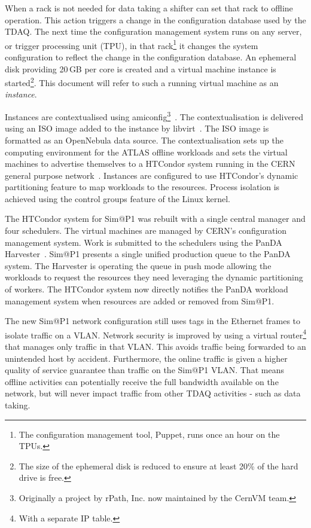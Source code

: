 \documentclass{webofc}
\begin{document}
When a rack is not needed for data taking a shifter can set that rack to
offline operation. This action triggers a change in the configuration database
used by the TDAQ. The next time the configuration management system runs on any
server, or trigger processing unit (TPU), in that rack\footnote{The
configuration management tool, Puppet, runs once an hour on the TPUs.} it
changes the system configuration to reflect the change in the configuration
database. An ephemeral disk providing 20\,\textrm{GB} per core is
created and a virtual machine instance is started\footnote{The size of the
ephemeral disk is reduced to ensure at least 20\% of the hard drive is free.}.
This document will refer to such a running virtual machine as an
\textit{instance}.

Instances are contextualised using amiconfig\footnote{Originally a
project by rPath, Inc. now maintained by the CernVM team.}~\cite{amiconfig}.
The contextualisation is delivered using an ISO image added to the instance
by libvirt~\cite{libvirt}. The ISO image is formatted as an OpenNebula data
source. The contextualisation sets up the computing environment for the ATLAS
offline workloads and sets the virtual machines to advertise themselves to a
HTCondor system running in the CERN general purpose network~\cite{condor}.
Instances are configured to use HTCondor's dynamic partitioning feature to
map workloads to the resources. Process isolation is achieved using the control
groups feature of the Linux kernel.

The HTCondor system for Sim@P1 was rebuilt with a single central manager and
four schedulers. The virtual machines are managed by CERN's configuration
management system. Work is submitted to the schedulers using the PanDA
Harvester~\cite{harvester}. Sim@P1 presents a single unified production queue to
the PanDA system. The Harvester is operating the queue in push mode allowing the
workloads to request the resources they need leveraging the dynamic partitioning
of workers.  The HTCondor system now directly notifies the PanDA workload
management system when resources are added or removed from Sim@P1.

The new Sim@P1 network configuration still uses tags in the Ethernet frames to
isolate traffic on a VLAN. Network security is improved by using a virtual
router\footnote{With a separate IP table.} that manages only traffic in that
VLAN. This avoids traffic being forwarded to an unintended host by accident.
Furthermore, the online traffic is given a higher quality of service guarantee
than traffic on the Sim@P1 VLAN. That means offline activities can potentially
receive the full bandwidth available on the network, but will never impact
traffic from other TDAQ activities - such as data taking.
\end{document}
